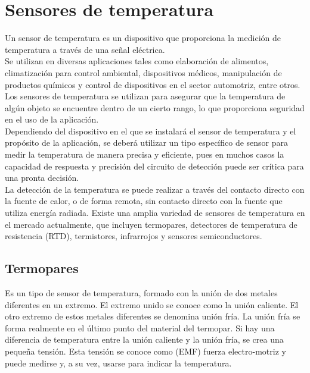 	\section{Sensores de temperatura}
	Un sensor de temperatura es un dispositivo que proporciona la medición de temperatura a través de una señal eléctrica. \\
		
	Se utilizan en diversas aplicaciones tales como elaboración de alimentos, climatización para control ambiental, dispositivos médicos, manipulación de productos químicos y control de dispositivos en el sector automotriz, entre otros. \cite{trerice2001}\\
		
	Los sensores de temperatura se utilizan para asegurar que la temperatura de algún objeto se encuentre dentro de un cierto rango, lo que proporciona seguridad en el uso de la aplicación. \cite{maximTemp} \\
		
	Dependiendo del dispositivo en el que se instalará el sensor de temperatura y el propósito de la aplicación, se deberá utilizar un tipo específico de sensor para medir la temperatura de manera precisa y eficiente, pues en muchos casos la capacidad de respuesta y precisión del circuito de detección puede ser crítica para una pronta decisión. \\
	
	La detección de la temperatura se puede realizar a través del contacto directo con la fuente de calor, o de forma remota, sin contacto directo con la fuente que utiliza energía radiada. Existe una amplia variedad de sensores de temperatura en el mercado actualmente, que incluyen termopares, detectores de temperatura de resistencia (RTD), termistores, infrarrojos y sensores semiconductores. \cite{agarwalTemp} \\

	
	\subsection{Termopares}
	Es un tipo de sensor de temperatura, formado con la unión de dos metales diferentes en un extremo. El extremo unido se conoce como la unión caliente. El otro extremo de estos metales diferentes se denomina unión fría. La unión fría se forma realmente en el último punto del material del termopar. Si hay una diferencia de temperatura entre la unión caliente y la unión fría, se crea una pequeña tensión. Esta tensión se conoce como (EMF) fuerza electro-motriz y puede medirse y, a su vez, usarse para indicar la temperatura. \cite{davis2017}
	
